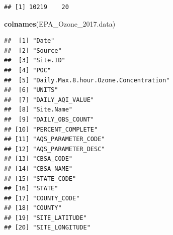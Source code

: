 \documentclass[12pt,]{article}
\newenvironment{Shaded}{\begin{snugshade}}{\end{snugshade}}
\newcommand{\KeywordTok}[1]{\textcolor[rgb]{0.13,0.29,0.53}{\textbf{#1}}}
\newcommand{\FloatTok}[1]{\textcolor[rgb]{0.00,0.00,0.81}{#1}}
\newcommand{\OperatorTok}[1]{\textcolor[rgb]{0.81,0.36,0.00}{\textbf{#1}}}
\newcommand{\NormalTok}[1]{#1}
\begin{document}
\begin{verbatim}
## [1] 10219    20
\end{verbatim}

\begin{Shaded}
\begin{Highlighting}[]
\KeywordTok{colnames}\NormalTok{(EPA_Ozone_}\FloatTok{2017.}\NormalTok{data)}
\end{Highlighting}
\end{Shaded}

\begin{verbatim}
##  [1] "Date"                                
##  [2] "Source"                              
##  [3] "Site.ID"                             
##  [4] "POC"                                 
##  [5] "Daily.Max.8.hour.Ozone.Concentration"
##  [6] "UNITS"                               
##  [7] "DAILY_AQI_VALUE"                     
##  [8] "Site.Name"                           
##  [9] "DAILY_OBS_COUNT"                     
## [10] "PERCENT_COMPLETE"                    
## [11] "AQS_PARAMETER_CODE"                  
## [12] "AQS_PARAMETER_DESC"                  
## [13] "CBSA_CODE"                           
## [14] "CBSA_NAME"                           
## [15] "STATE_CODE"                          
## [16] "STATE"                               
## [17] "COUNTY_CODE"                         
## [18] "COUNTY"                              
## [19] "SITE_LATITUDE"                       
## [20] "SITE_LONGITUDE"
\end{verbatim}

\begin{Shaded}
\end{Shaded}
\end{document}
